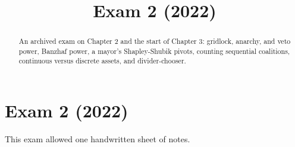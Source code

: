 \documentclass[12pt]{ximera}
\title{Exam 2 (2022)}
\begin{document}
\begin{abstract}
An archived exam on Chapter 2 and the start of Chapter 3: gridlock, anarchy, and veto power, Banzhaf power, a mayor's Shapley-Shubik pivots, counting sequential coalitions, continuous versus discrete assets, and divider-chooser.
\end{abstract}
\maketitle

\section*{Exam 2 (2022)}

This exam allowed one handwritten sheet of notes.
\end{document}
